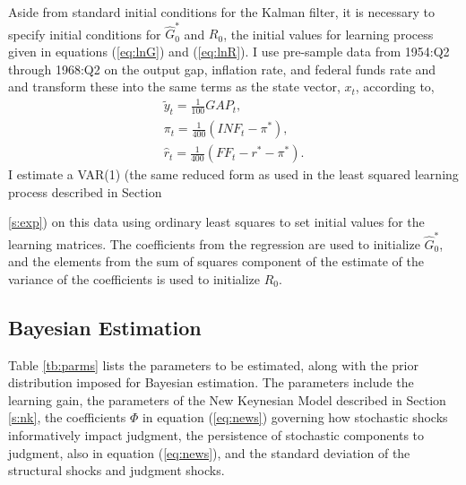 \documentclass[10pt]{article}
\newcommand{\bdm}{\begin{displaymath}}
\newcommand{\edm}{\end{displaymath}}
\newcommand{\h}[1]{\hat{#1}}
\newcommand{\ds}{\displaystyle}
\begin{document}
Aside from standard initial conditions for the Kalman filter, it is necessary to specify initial conditions for $\h{G}_{0}^{*}$ and $R_{0}$, the initial values for learning process given in equations (\ref{eq:lnG}) and (\ref{eq:lnR}).  I use pre-sample data from 1954:Q2 through 1968:Q2 on the output gap, inflation rate, and federal funds rate and and transform these into the same terms as the state vector, $x_t$, according to,
\bdm \begin{array}{l}
\ds \tilde{y}_t = \frac{1}{100} GAP_t, \\ [1pc]
\ds \pi_t = \frac{1}{400} (INF_t - \pi^{*}), \\ [1pc]
\ds \h{r}_t = \frac{1}{400} (FF_t - r^{*} - \pi^*).
\end{array}
\edm
I estimate a VAR(1) (the same reduced form as used in the least squared learning process described in Section {\ref{s:exp}) on this data using ordinary least squares to set initial values for the learning matrices.  The coefficients from the regression are used to initialize $\h{G}_{0}^{*}$, and the elements from the sum of squares component of the estimate of the variance of the coefficients is used to initialize $R_{0}$.

\subsection{Bayesian Estimation}

Table \ref{tb:parms} lists the parameters to be estimated, along with the prior distribution imposed for Bayesian estimation.  The parameters include the learning gain, the parameters of the New Keynesian Model described in Section \ref{s:nk}, the coefficients $\Phi$ in equation (\ref{eq:news}) governing how stochastic shocks informatively impact judgment, the persistence of stochastic components to judgment, also in equation (\ref{eq:news}), and the standard deviation of the structural shocks and judgment shocks. 

}
\end{document}
